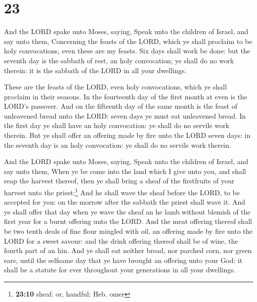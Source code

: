 \hypertarget{section-22}{%
\section{23}\label{section-22}}

 And the LORD spake unto Moses, saying, 
Speak unto the children of Israel, and say unto them, Concerning the
feasts of the LORD, which ye shall proclaim to be holy convocations,
even these are my feasts.  Six days shall work be done:
but the seventh day is the sabbath of rest, an holy convocation; ye
shall do no work therein: it is the sabbath of the LORD in all your
dwellings.

 These are the feasts of the LORD, even holy convocations,
which ye shall proclaim in their seasons.  In the
fourteenth day of the first month at even is the LORD's passover.
 And on the fifteenth day of the same month is the feast
of unleavened bread unto the LORD: seven days ye must eat unleavened
bread.  In the first day ye shall have an holy
convocation: ye shall do no servile work therein.  But ye
shall offer an offering made by fire unto the LORD seven days: in the
seventh day is an holy convocation: ye shall do no servile work therein.

 And the LORD spake unto Moses, saying, 
Speak unto the children of Israel, and say unto them, When ye be come
into the land which I give unto you, and shall reap the harvest thereof,
then ye shall bring a sheaf of the firstfruits of your harvest unto the
priest:\footnote{\textbf{23:10} sheaf: or, handful: Heb. omer}
 And he shall wave the sheaf before the LORD, to be
accepted for you: on the morrow after the sabbath the priest shall wave
it.  And ye shall offer that day when ye wave the sheaf
an he lamb without blemish of the first year for a burnt offering unto
the LORD.  And the meat offering thereof shall be two
tenth deals of fine flour mingled with oil, an offering made by fire
unto the LORD for a sweet savour: and the drink offering thereof shall
be of wine, the fourth part of an hin.  And ye shall eat
neither bread, nor parched corn, nor green ears, until the selfsame day
that ye have brought an offering unto your God: it shall be a statute
for ever throughout your generations in all your dwellings.


